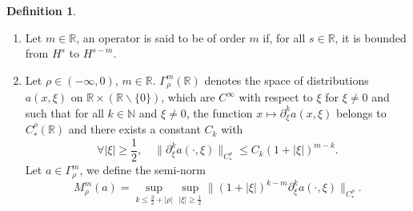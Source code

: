 \documentclass[10pt]{amsart}
\theoremstyle{remark}
\theoremstyle{definition}
\newtheorem{definition}[theorem]{Definition}
\numberwithin{equation}{section}
\begin{document}
\begin{definition}
\begin{enumerate}
\item Let $m\in \mathbb{R}$, an operator  is said to be of order $m$ if, for all $s\in \mathbb{R}$, it is bounded from $H^s$ to $H^{s-m}$.
\item  Let $\rho\in (-\infty, 0)$, $m\in \mathbb{R}$. 
$\Gamma^m_\rho(\mathbb{R})$ denotes the space of distributions $a(x, \xi)$ on $\mathbb{R}\times (\mathbb{R}\backslash \{0\})$, which are $C^\infty$ with respect to $\xi$ for $\xi \neq 0$ and such that for all $k \in \mathbb{N}$ and $\xi \neq 0$, the function $x\mapsto \partial_\xi^k a(x,\xi)$ belongs to $C^{\rho}_* (\mathbb{R})$ and there exists a constant $C_k$ with
\begin{equation*}
\forall |\xi|\geq \frac{1}{2}, \quad \|\partial_\xi^k a(\cdot,\xi) \|_{C^{\rho}_*} \leq C_k (1+ |\xi|)^{m-k}.
\end{equation*}
Let $a\in \Gamma^m_\rho$,  we define the semi-norm
\begin{equation*}
M^m_{\rho}(a) = \sup_{k \leq \frac{3}{2}+|\rho|} \sup_{|\xi|\geq \frac{1}{2}} \|(1+ |\xi|)^{k-m}\partial_\xi^k a(\cdot,\xi)  \|_{C^{\rho}_*}.
\end{equation*}
\end{enumerate}
\end{definition}
\end{document}
